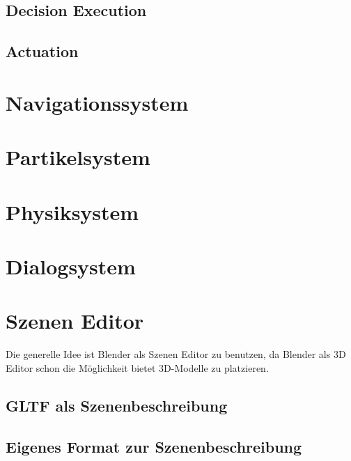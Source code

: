 \subsection{Decision Execution}
\subsection{Actuation}

\section{Navigationssystem}

\section{Partikelsystem}

\section{Physiksystem}

\section{Dialogsystem}

\section{Szenen Editor}

Die generelle Idee ist Blender als Szenen Editor zu benutzen, da Blender als 3D Editor schon die Möglichkeit bietet 3D-Modelle zu platzieren.

\subsection{GLTF als Szenenbeschreibung}

\subsection{Eigenes Format zur Szenenbeschreibung}